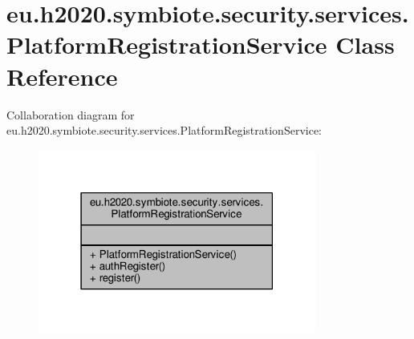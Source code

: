 \hypertarget{classeu_1_1h2020_1_1symbiote_1_1security_1_1services_1_1PlatformRegistrationService}{}\section{eu.\+h2020.\+symbiote.\+security.\+services.\+Platform\+Registration\+Service Class Reference}
\label{classeu_1_1h2020_1_1symbiote_1_1security_1_1services_1_1PlatformRegistrationService}


Collaboration diagram for eu.\+h2020.\+symbiote.\+security.\+services.\+Platform\+Registration\+Service\+:
\nopagebreak
\begin{figure}[H]
\begin{center}
\leavevmode
\includegraphics[width=259pt]{classeu_1_1h2020_1_1symbiote_1_1security_1_1services_1_1PlatformRegistrationService__coll__graph}
\end{center}
\end{figure}
